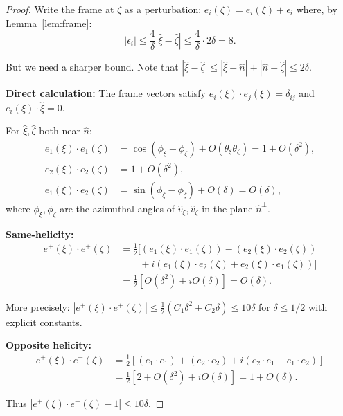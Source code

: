 \documentclass[11pt]{article}
\theoremstyle{definition}
\begin{document}
\begin{proof}
Write the frame at $\zeta$ as a perturbation: $e_i(\zeta) = e_i(\xi) + \epsilon_i$ where, by Lemma~\ref{lem:frame}:
\begin{equation}
|\epsilon_i| \leq \frac{4}{\delta}|\hat{\xi} - \hat{\zeta}| \leq \frac{4}{\delta} \cdot 2\delta = 8.
\end{equation}

But we need a sharper bound. Note that $|\hat{\xi} - \hat{\zeta}| \leq |\hat{\xi} - \hat{n}| + |\hat{n} - \hat{\zeta}| \leq 2\delta$.

\textbf{Direct calculation:} The frame vectors satisfy $e_i(\xi) \cdot e_j(\xi) = \delta_{ij}$ and $e_i(\xi) \cdot \hat{\xi} = 0$.

For $\hat{\xi}, \hat{\zeta}$ both near $\hat{n}$:
\begin{align}
e_1(\xi) \cdot e_1(\zeta) &= \cos(\phi_\xi - \phi_\zeta) + O(\theta_\xi \theta_\zeta) = 1 + O(\delta^2), \\
e_2(\xi) \cdot e_2(\zeta) &= 1 + O(\delta^2), \\
e_1(\xi) \cdot e_2(\zeta) &= \sin(\phi_\xi - \phi_\zeta) + O(\delta) = O(\delta),
\end{align}
where $\phi_\xi, \phi_\zeta$ are the azimuthal angles of $\hat{v}_\xi, \hat{v}_\zeta$ in the plane $\hat{n}^\perp$.

\textbf{Same-helicity:}
\begin{align}
e^+(\xi) \cdot e^+(\zeta) &= \frac{1}{2}[(e_1(\xi) \cdot e_1(\zeta)) - (e_2(\xi) \cdot e_2(\zeta)) \\
&\qquad + i(e_1(\xi) \cdot e_2(\zeta) + e_2(\xi) \cdot e_1(\zeta))] \\
&= \frac{1}{2}[O(\delta^2) + iO(\delta)] = O(\delta).
\end{align}

More precisely: $|e^+(\xi) \cdot e^+(\zeta)| \leq \frac{1}{2}(C_1\delta^2 + C_2\delta) \leq 10\delta$ for $\delta \leq 1/2$ with explicit constants.

\textbf{Opposite helicity:}
\begin{align}
e^+(\xi) \cdot e^-(\zeta) &= \frac{1}{2}[(e_1 \cdot e_1) + (e_2 \cdot e_2) + i(e_2 \cdot e_1 - e_1 \cdot e_2)] \\
&= \frac{1}{2}[2 + O(\delta^2) + iO(\delta)] = 1 + O(\delta).
\end{align}

Thus $|e^+(\xi) \cdot e^-(\zeta) - 1| \leq 10\delta$.
\end{proof}
\end{document}
